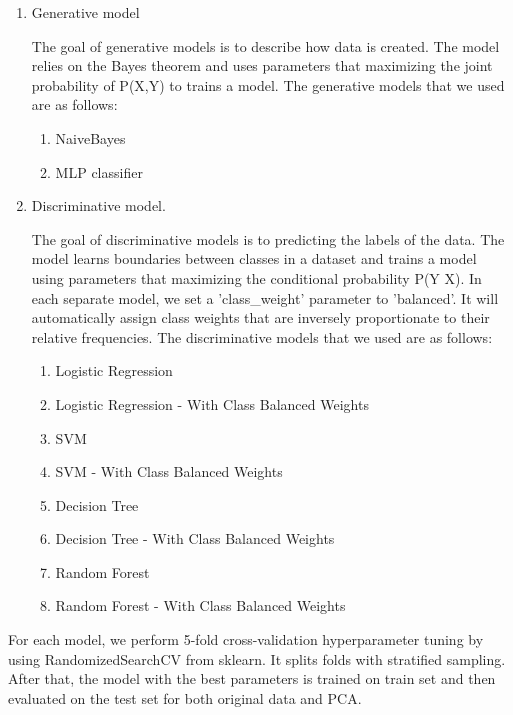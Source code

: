 \begin{enumerate}
    \item Generative model 
    
    The goal of generative models is to describe how data is created. The model relies on the Bayes theorem and uses parameters that maximizing the joint probability of P(X,Y) to trains a model. The generative models that we used are as follows:
    
    \begin{enumerate}
        \item NaiveBayes
        \item MLP classifier
    \end{enumerate}
    
    \item Discriminative model.
    
    The goal of discriminative models is to predicting the labels of the data. The model learns boundaries between classes in a dataset and trains a model using parameters that maximizing the conditional probability P(Y \textbar X). In each separate model, we set a 'class\_weight' parameter to 'balanced'. It will automatically assign class weights that are inversely proportionate to their relative frequencies. The discriminative models that we used are as follows:
    
    \begin{enumerate}
        \item Logistic Regression
        \item Logistic Regression - With Class Balanced Weights
        \item SVM
        \item SVM - With Class Balanced Weights
        \item Decision Tree
        \item Decision Tree - With Class Balanced Weights
        \item Random Forest
        \item Random Forest - With Class Balanced Weights
    \end{enumerate}
\end{enumerate}

For each model, we perform 5-fold cross-validation hyperparameter tuning by using RandomizedSearchCV from sklearn. It splits folds with stratified sampling. After that, the model with the best parameters is trained on train set and then evaluated on the test set for both original data and PCA.

